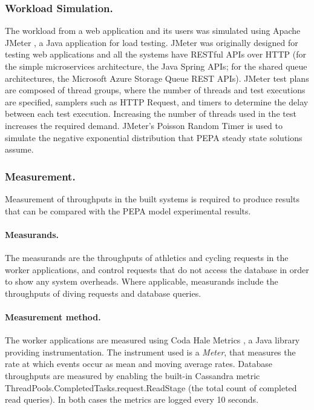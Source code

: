 \subsubsection{Workload Simulation.}  The workload from a web application and its users was simulated using Apache JMeter \cite{RN1074}, a Java application for load testing.  JMeter was originally designed for testing web applications and all the systems have RESTful APIs over HTTP (for the simple microservices architecture, the Java Spring APIs; for the shared queue architectures, the Microsoft Azure Storage Queue REST APIs).  JMeter test plans are composed of thread groups, where the number of threads and test executions are specified, samplers such as HTTP Request, and timers to determine the delay between each test execution.  Increasing the number of threads used in the test increases the required demand.  JMeter's Poisson Random Timer is used to simulate the negative exponential distribution \cite{RN80} that PEPA steady state solutions assume.

\subsubsection{Measurement.}  Measurement of throughputs in the built systems is required to produce results that can be compared with the PEPA model experimental results.

\paragraph{Measurands.} The measurands are the throughputs of athletics and cycling requests in the worker applications, and control requests that do not access the database in order to show any system overheads.  Where applicable, measurands include the throughputs of diving requests and database queries.

\paragraph{Measurement method.}  The worker applications are measured using Coda Hale Metrics \cite{RN1079}, a Java library providing instrumentation.  The instrument used is a {\itshape Meter}, that measures the rate at which events occur as mean and moving average rates.  Database throughputs are measured by enabling the built-in Cassandra metric ThreadPools.CompletedTasks.request.ReadStage (the total count of completed read queries).  In both cases the metrics are logged every 10 seconds.

